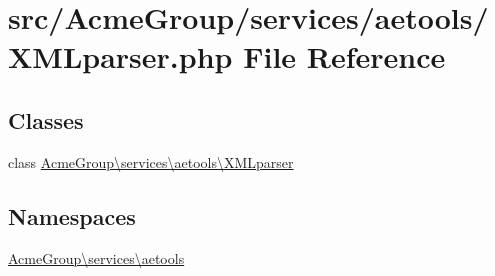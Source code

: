 \hypertarget{_x_m_lparser_8php}{\section{src/\+Acme\+Group/services/aetools/\+X\+M\+Lparser.php File Reference}
\label{_x_m_lparser_8php}
}
\subsection*{Classes}
\begin{DoxyCompactItemize}
\item 
class \hyperlink{class_acme_group_1_1services_1_1aetools_1_1_x_m_lparser}{Acme\+Group\textbackslash{}services\textbackslash{}aetools\textbackslash{}\+X\+M\+Lparser}
\end{DoxyCompactItemize}
\subsection*{Namespaces}
\begin{DoxyCompactItemize}
\item 
 \hyperlink{namespace_acme_group_1_1services_1_1aetools}{Acme\+Group\textbackslash{}services\textbackslash{}aetools}
\end{DoxyCompactItemize}

